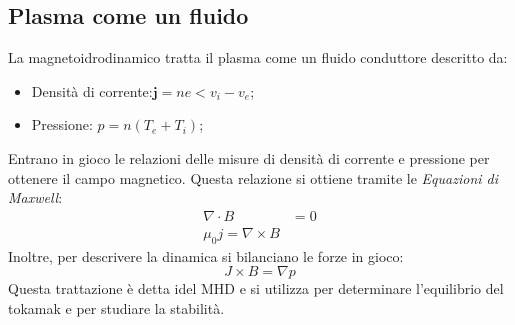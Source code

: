\documentclass{article}
\begin{document}
\subsection{Plasma come un fluido}
La magnetoidrodinamico tratta il plasma come un fluido conduttore descritto da:
\begin{itemize}
	\item Densità di corrente:\(\mathbf{j}=ne<v_{i}-v_{e}\);
	\item Pressione: \(p=n(T_{e}+T_{i})\);
\end{itemize}
Entrano in gioco le relazioni delle misure di densità di corrente e pressione per ottenere il campo magnetico. Questa relazione si ottiene tramite le \emph{Equazioni di Maxwell}:\begin{align*}
	\nabla \cdot B & =0 \\
	\mu_{0}j=\nabla\times B
\end{align*}
Inoltre, per descrivere la dinamica si bilanciano le forze in gioco:\begin{equation*}
	J\times B = \nabla p
\end{equation*}
Questa trattazione è detta idel MHD e si utilizza per determinare l'equilibrio del tokamak e per studiare la stabilità.
\end{document}
